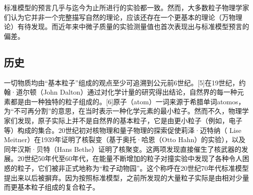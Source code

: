 标准模型的预言几乎与迄今为止所进行的实验都一致。然而，大多数粒子物理学家们认为它并非一个完整描写自然的理论，应该还存在一个更基本的理论（万物理论）有待发现。而近年来中微子质量的实验测量值也首次表现出与标准模型预言的偏差。

\subsection{历史}
一切物质均由“基本粒子”组成的观点至少可追溯到公元前6世纪。[5]在19世纪，约翰·道尔顿（John Dalton）通过对化学计量的研究得出结论，自然界的每一种元素都是由一种独特的粒子组成的。[6]原子（atom）一词来源于希腊单词atomos，为“不可再分割”的意思，在当时表示一种化学元素的最小粒子。然而不久，物理学家们发现，原子实际上并不是自然界的基本粒子，它是由更小粒子（例如，电子等）构成的集合。20世纪初对核物理和量子物理的探索促使莉泽·迈特纳（ Lise Meitner）在1939年证明了核裂变（基于奥托·哈恩（Otto Hahn）的实验），以及同年汉斯·贝特（Hans Bethe）证明了核聚变。这两项发现直接催生了核武器的发展。20世纪50年代至60年代，在能量不断增加的粒子对撞实验中发现了各种令人困惑的粒子，它们被非正式地称为“粒子动物园”。这个称呼在20世纪70年代标准模型提出来以后被摒弃。因为按照标准模型，之前所发现的大量粒子实际是由相对少量而更基本粒子组成的复合粒子。

\su